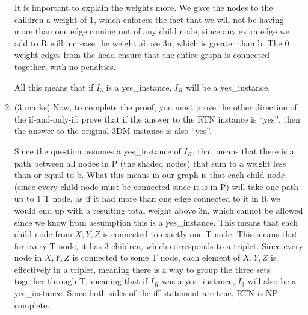 \documentclass[11pt]{article}
\begin{document}
\begin{enumerate}
\begin{soln}
It is important to explain the weights more. We gave the nodes to the children a weight of 1, which enforces the fact that we will not be having more than one edge coming out of any child node, since any extra edge we add to R will increase the weight above 3n, which is greater than b. The 0 weight edges from the head ensure that the entire graph is connected together, with no penalties.

All this means that if $I_3$ is a yes\_instance, $I_R$ will be a yes\_instance.
\end{soln}

\item (3 marks)
Now, to complete the proof, you must prove the other direction of the
if-and-only-if:
prove
that if the answer to the RTN instance is ``yes'', then the
answer to the original 3DM instance is also ``yes''.

\begin{soln}
Since the question assumes a yes\_instance of $I_R$, that means that there is a path between all nodes in P (the shaded nodes) that sum to a weight less than or equal to b. What this means in our graph is that each child node (since every child node must be connected since it is in P) will take one path up to 1 T node, as if it had more than one edge connected to it in R we would end up with a resulting total weight above 3n, which cannot be allowed since we know from assumption this is a yes\_instance. This means that each child node from $X, Y, Z$ is connected to exactly one T node. This means that for every T node, it has 3 children, which corresponds to a triplet. Since every node in $X,Y,Z$ is connected to some T node, each element of $X,Y,Z$ is effectively in a triplet, meaning there is a way to group the three sets together through T, meaning that if $I_R$ was a yes\_instance, $I_3$ will also be a yes\_instance. Since both sides of the iff statement are true, RTN is NP-complete.
\end{soln}

\end{enumerate}
\end{document}
